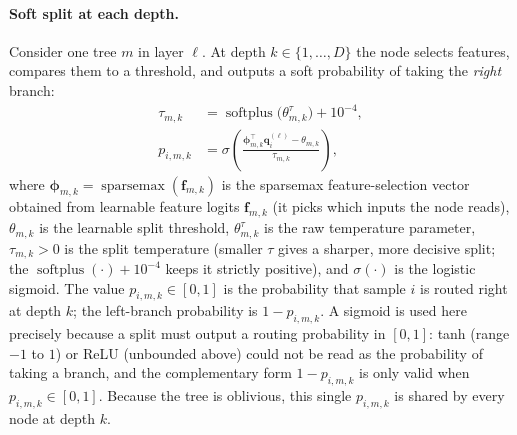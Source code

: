 \paragraph{Soft split at each depth.}
Consider one tree \(m\) in layer \(\ell\). At depth \(k\in\{1,\dots,D\}\) the
node selects features, compares them to a threshold, and outputs a soft
probability of taking the \emph{right} branch:
\begin{align}
\tau_{m,k}
&=
\operatorname{softplus}\!\big(\theta^{\tau}_{m,k}\big)+10^{-4},
\label{eq:temperature}\\[2pt]
p_{i,m,k}
&=
\sigma\!\left(
\frac{\boldsymbol\phi_{m,k}^{\!\top}\mathbf q_i^{(\ell)}-\theta_{m,k}}
{\tau_{m,k}}
\right),
\label{eq:split}
\end{align}
where \(\boldsymbol\phi_{m,k}=\operatorname{sparsemax}(\mathbf f_{m,k})\) is
the sparsemax feature-selection vector obtained from learnable feature
logits \(\mathbf f_{m,k}\) (it picks which inputs the node reads),
\(\theta_{m,k}\) is the learnable split threshold, \(\theta^{\tau}_{m,k}\) is
the raw temperature parameter, \(\tau_{m,k}>0\) is the split temperature
(smaller \(\tau\) gives a sharper, more decisive split; the
\(\operatorname{softplus}(\cdot)+10^{-4}\) keeps it strictly positive), and
\(\sigma(\cdot)\) is the logistic sigmoid. The value \(p_{i,m,k}\in[0,1]\) is
the probability that sample \(i\) is routed right at depth \(k\); the
left-branch probability is \(1-p_{i,m,k}\). A sigmoid is used here precisely
because a split must output a routing probability in \([0,1]\): tanh (range
\(-1\) to \(1\)) or ReLU (unbounded above) could not be read as the
probability of taking a branch, and the complementary form \(1-p_{i,m,k}\)
is only valid when \(p_{i,m,k}\in[0,1]\). Because the tree is oblivious,
this single \(p_{i,m,k}\) is shared by every node at depth \(k\).
